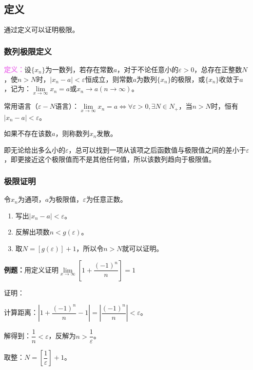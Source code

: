\documentclass[UTF8, 12pt]{ctexart}
\begin{document}
    \subsection{定义}

    通过定义可以证明极限。

    \subsubsection{数列极限定义}

    \textcolor{violet}{\textbf{定义：}}设$\{x_n\}$为一数列，若存在常数$a$，对于不论任意小的$\varepsilon>0$，总存在正整数$N$，使$n>N$时，$\vert x_n-a\vert<\varepsilon$恒成立，则常数$a$为数列$\{x_n\}$的极限，或$\{x_n\}$收敛于$a$，记为：$\lim\limits_{x\to\infty}x_n=a$或$x_n\to a(n\to\infty)$。

    常用语言（$\varepsilon-N$语言）：$\lim\limits_{x\to\infty}x_n=a\Leftrightarrow\forall\varepsilon>0,\exists N\in N_+$，当$n>N$时，恒有$\vert x_n-a\vert<\varepsilon$。

    如果不存在该数$a$，则称数列$x_n$发散。

    即无论给出多么小的$\varepsilon$，总可以找到一项从该项之后函数值与极限值之间的差小于$\varepsilon$，即更接近这个极限值而不是其他任何值，所以该数列趋向于极限值。

    \subsubsection{极限证明}

    令$x_n$为通项，$a$为极限值，$\varepsilon$为任意正数。

    \begin{enumerate}
        \item 写出$\vert x_n-a|<\varepsilon$。
        \item 反解出项数$n<g(\varepsilon)$。
        \item 取$N=[g(\varepsilon)]+1$，所以令$n>N$就可以证明。
    \end{enumerate}

    \textbf{例题：}用定义证明$\lim\limits_{x\to\infty}\left[1+\dfrac{(-1)^n}{n}\right]=1$

    证明：

    计算距离：$\left\vert 1+\dfrac{(-1)^n}{n}-1\right\vert=\left\vert\dfrac{(-1)^n}{n}\right\vert<\varepsilon$。

    解得到：$\dfrac{1}{n}<\varepsilon$，反解为$n>\dfrac{1}{\varepsilon}$。

    取整：$N=\left[\dfrac{1}{\varepsilon}\right]+1$。
\end{document}
